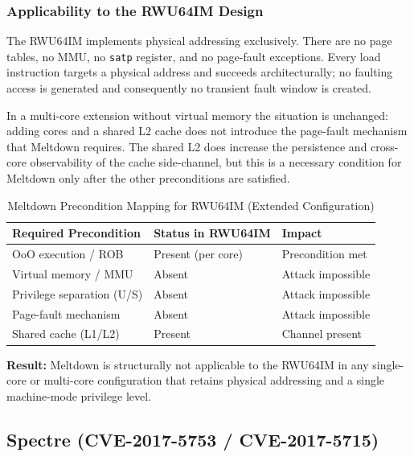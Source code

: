\subsubsection{Applicability to the RWU64IM Design}

The RWU64IM implements physical addressing exclusively. There are no page
tables, no MMU, no \texttt{satp} register, and no page-fault exceptions. Every
load instruction targets a physical address and succeeds architecturally; no
faulting access is generated and consequently no transient fault window is
created.

In a multi-core extension without virtual memory the situation is unchanged:
adding cores and a shared \mbox{L2} cache does not introduce the page-fault
mechanism that Meltdown requires. The shared \mbox{L2} does increase the
persistence and cross-core observability of the cache side-channel, but this is
a necessary condition for Meltdown only after the other preconditions are
satisfied.

\begin{table}[h]
  \centering
  \caption{Meltdown Precondition Mapping for RWU64IM (Extended Configuration)}
  \label{tab:meltdown_precond}
  \begin{tabular}{lll}
    \hline
    \textbf{Required Precondition} & \textbf{Status in RWU64IM} & \textbf{Impact}   \\
    \hline
    OoO execution / ROB            & Present (per core)         & Precondition met  \\
    Virtual memory / MMU           & Absent                     & Attack impossible \\
    Privilege separation (U/S)     & Absent                     & Attack impossible \\
    Page-fault mechanism           & Absent                     & Attack impossible \\
    Shared cache (L1/L2)           & Present                    & Channel present   \\
    \hline
  \end{tabular}
\end{table}

\textbf{Result:} Meltdown is structurally not applicable to the RWU64IM in any
single-core or multi-core configuration that retains physical addressing and a single
machine-mode privilege level.

\subsection{Spectre (CVE-2017-5753 / CVE-2017-5715)}
\label{subsec:spectre}

